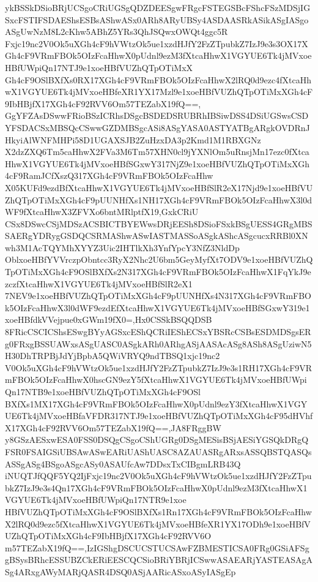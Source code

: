 \documentclass[multi=frame]{standalone}
\begin{document}
\begin{world}
        ykBSSkDSioBRjUCSgoCRiUGSgQDZDEESgwFRgcFSTEGSBcFShcFSzMDSjIGSxcFSTIFSDAEShsESBsAShwASx0ARh8ARyUBSy4ASDAASRkASikASgIASgoASgUwNzM8L2cKhw5ABhZ5YRs3QhJSQwxOWQt4ggc5R
        Fxjc19nc2V0Ok5uXGh4cF9hVWtzOk5ue1xzdHJfY2FzZTpubkZ7IzJ9e3s3OX17XGh4cF9VRmFBOk5OIzFcaHhwX0pUdnl9ezM3fXtcaHhwX1VGYUE6Tk4jMVxoeHBfUWpiQn17NTJ9e1xoeHBfVUZhQTpOTiMxX
        Gh4cF9OSlBXfXs0RX17XGh4cF9VRmFBOk5OIzFcaHhwX2lRQ0d9ezc4fXtcaHhwX1VGYUE6Tk4jMVxoeHBfeXR1YX17Mzl9e1xoeHBfVUZhQTpOTiMxXGh4cF9IbHBjfX17XGh4cF92RVV6Om57TEZabX19fQ==,
        GgYFZAsDSwwFRioBSzICRhsDSgcBSDEDSRUBRhIBSiwDSS4DSiUGSwsCSDYFSDACSxMBSQcCSwwGZDMBSgcASi8ASgYASA0ASTYATBgARgkOVDRnJHkyiAlWNFMHPi58D1UGAXSJB2ZuHzxDA3p2Kmd1M1RBXGNz
        X2dzZXQ6Tm5caHhwX2FVa3M6Tm57XHN0cl9jYXNlOm5uRnsjMn17ezc0fXtcaHhwX1VGYUE6Tk4jMVxoeHBfSGxwY317NjZ9e1xoeHBfVUZhQTpOTiMxXGh4cF9RamJCfXszQ317XGh4cF9VRmFBOk5OIzFcaHhw
        X05KUFd9ezdBfXtcaHhwX1VGYUE6Tk4jMVxoeHBfSlR2eX17Njd9e1xoeHBfVUZhQTpOTiMxXGh4cF9pUUNHfXs1NH17XGh4cF9VRmFBOk5OIzFcaHhwX3l0dWF9fXtcaHhwX3ZFVXo6bntMRlptfX19,GxkCRiU
        CSx8DSwcCSjMDSzACSBICTBYEWwsDRjEESh8DSioFSxkBSgUESS4GRgMBSSAERgYDRygGSDQCSRMAShwASwIASTMASSoASgkAShcASgcucxRRBl0XNwh3M1AcTQYMhXYYZ3Uic2IHTlkXh3YnfYpcY3NfZ3NldDp
        OblxoeHBfYVVrczpObntcc3RyX2Nhc2U6bm5GeyMyfXt7ODV9e1xoeHBfVUZhQTpOTiMxXGh4cF9OSlBXfXs2N317XGh4cF9VRmFBOk5OIzFcaHhwX1FqYkJ9ezczfXtcaHhwX1VGYUE6Tk4jMVxoeHBfSlR2eX1
        7NEV9e1xoeHBfVUZhQTpOTiMxXGh4cF9pUUNHfXs4N317XGh4cF9VRmFBOk5OIzFcaHhwX3l0dWF9ezdEfXtcaHhwX1VGYUE6Tk4jMVxoeHBfSGxwY319e1xoeHBfdkVVejpue0xGWm19fX0=,Hx0CSSkBSQQDSB
        8FRicCSCICShsESwgBYyAGSxcEShQCRiIEShECSxYBSRcCSBsESDMDSgsERg0FRxgBSSUAWxsASgUASC0ASgkARh0ARhgASjAASAcASg8ASh8ASgUziwN5H30DhTRPBjJdYjBpbA5QWiVRYQ9ndTBSQ1xjc19nc2
        V0Ok5uXGh4cF9hVWtzOk5ue1xzdHJfY2FzZTpubkZ7IzJ9e3s1RH17XGh4cF9VRmFBOk5OIzFcaHhwX0hscGN9ezY5fXtcaHhwX1VGYUE6Tk4jMVxoeHBfUWpiQn17NTB9e1xoeHBfVUZhQTpOTiMxXGh4cF9OSl
        BXfXs1MX17XGh4cF9VRmFBOk5OIzFcaHhwX0pUdnl9ezY3fXtcaHhwX1VGYUE6Tk4jMVxoeHBfaVFDR317NTJ9e1xoeHBfVUZhQTpOTiMxXGh4cF95dHVhfX17XGh4cF92RVV6Om57TEZabX19fQ==,JA8FRggBW
        y8GSzAESxwESA0FSS0DSQgCSgoCShUGRg0DSgMESisBSjAESiYGSQkDRgQFSR0FSAIGSiUBSAwASwEARiUAShUASC8AZAUASRgARxsASSQBSTQASQsASSgASg4BSgoASgcASy0ASAUfcAw7DDsxTxCIBgmLRB43Q
        iNUQTJfQQF5YQ2IjFxjc19nc2V0Ok5uXGh4cF9hVWtzOk5ue1xzdHJfY2FzZTpubkZ7IzJ9e3s4Qn17XGh4cF9VRmFBOk5OIzFcaHhwX0pUdnl9ezM3fXtcaHhwX1VGYUE6Tk4jMVxoeHBfUWpiQn17NTR9e1xoe
        HBfVUZhQTpOTiMxXGh4cF9OSlBXfXs1Rn17XGh4cF9VRmFBOk5OIzFcaHhwX2lRQ0d9ezc5fXtcaHhwX1VGYUE6Tk4jMVxoeHBfeXR1YX17ODh9e1xoeHBfVUZhQTpOTiMxXGh4cF9IbHBjfX17XGh4cF92RVV6O
        m57TEZabX19fQ==,IzIGShgDSCUCSTUCSAwFZBMESTICSA0FRg0GSiAFSggBSysBRhcESSUBZCkERiEESCQCSioBRiYBRjICSwwASAEARjYASTEASAgASg4ARxgAWyMARjQASR4DSQ0ASjAARicASxoASyIASgEp

\end{world}
\end{document}
